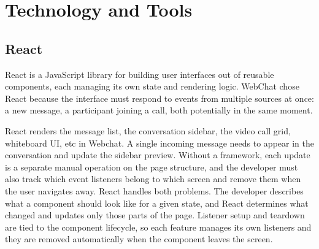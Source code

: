 \documentclass[12pt,a4paper]{article}
\begin{document}
\section{Technology and Tools}

\subsection{React}

React is a JavaScript library for building user interfaces out of reusable components, each managing its own state and rendering logic. WebChat chose React because the interface must respond to events from multiple sources at once: a new message, a participant joining a call, both potentially in the same moment.

React renders the message list, the conversation sidebar, the video call grid, whiteboard UI, etc in Webchat. A single incoming message needs to appear in the conversation and update the sidebar preview. Without a framework, each update is a separate manual operation on the page structure, and the developer must also track which event listeners belong to which screen and remove them when the user navigates away. React handles both problems. The developer describes what a component should look like for a given state, and React determines what changed and updates only those parts of the page. Listener setup and teardown are tied to the component lifecycle, so each feature manages its own listeners and they are removed automatically when the component leaves the screen.

\end{document}
